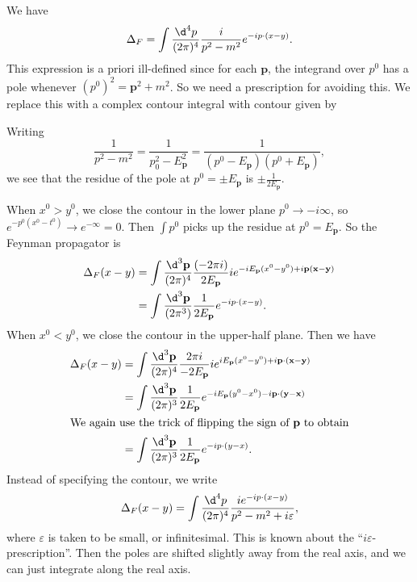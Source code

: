 \documentclass[a4paper]{article}
\begin{document}
\begin{prop}
  We have
  \[
    \Delta_F = \int \frac{\d^4 p}{(2\pi)^4 } \frac{i}{p^2 - m^2} e^{-ip \cdot (x - y)}.
  \]
  This expression is a priori ill-defined since for each $\mathbf{p}$, the integrand over $p^0$ has a pole whenever $(p^0)^2 = \mathbf{p}^2 + m^2$. So we need a prescription for avoiding this. We replace this with a complex contour integral with contour given by
  \begin{center}
  \end{center}
  Writing
  \[
    \frac{1}{p^2 - m^2} = \frac{1}{p_0^2 - E_\mathbf{p}^2} = \frac{1}{(p^0 - E_\mathbf{p})(p^0 + E_\mathbf{p})},
  \]
  we see that the residue of the pole at $p^0 = \pm E_\mathbf{p}$ is $\pm \frac{1}{2E_\mathbf{p}}$.

  When $x^0 > y^0$, we close the contour in the lower plane $p^0 \to -i\infty$, so $e^{-p^0(x^0 - t^0)} \to e^{-\infty} = 0$. Then $\int p^0$ picks up the residue at $p^0 = E_\mathbf{p}$. So the Feynman propagator is
  \begin{align*}
    \Delta_F (x - y) &= \int \frac{\d ^3 \mathbf{p}}{(2\pi)^4} \frac{(-2\pi i)}{2E_\mathbf{p}} i e^{-iE_\mathbf{p}(x^0 - y^0) + i \mathbf{p} (\mathbf{x} - \mathbf{y})}\\
    &= \int \frac{\d^3 \mathbf{p}}{(2\pi^3)} \frac{1}{2 E_\mathbf{p}} e^{-ip \cdot (x - y)}.
  \end{align*}
  When $x^0 < y^0$, we close the contour in the upper-half plane. Then we have
  \begin{align*}
    \Delta_F(x - y) &= \int \frac{\d^3 \mathbf{p}}{(2\pi)^4} \frac{2\pi i}{-2E_\mathbf{p}} i e^{iE_\mathbf{p} (x^0 - y^0) + i\mathbf{p} \cdot (\mathbf{x} - \mathbf{y})}\\
    &= \int \frac{\d^3 \mathbf{p}}{(2\pi)^3} \frac{1}{2E_\mathbf{p}} e^{-i E_\mathbf{p}(y^0 - x^0) - i \mathbf{p}\cdot (\mathbf{y} - \mathbf{x})}\\
    \intertext{We again use the trick of flipping the sign of $\mathbf{p}$ to obtain}
    &= \int \frac{\d^3 \mathbf{p}}{(2\pi)^3} \frac{1}{2E_\mathbf{p}} e^{-ip\cdot(y - x)}.
  \end{align*}
  Instead of specifying the contour, we write
  \[
    \Delta_F(x - y) = \int \frac{\d^4 p}{(2\pi)^4} \frac{i e^{-ip\cdot(x - y)}}{p^2 - m^2 + i \varepsilon},
  \]
  where $\varepsilon$ is taken to be small, or infinitesimal. This is known about the ``$i\varepsilon$-prescription''. Then the poles are shifted slightly away from the real axis, and we can just integrate along the real axis.
\end{prop}
\end{document}
